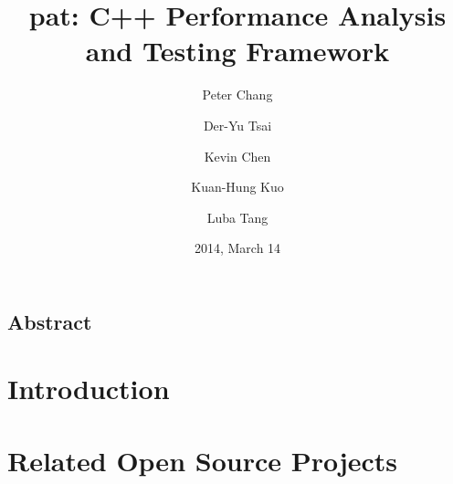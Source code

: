 \documentclass[letterpaper,twocolumn,10pt]{article}
\begin{document}
\date{2014, March 14}

\title{\Large \bf pat: C++ Performance Analysis and Testing Framework}

\author{Peter Chang}
\author{Der-Yu Tsai}
\author{Kevin Chen}
\author{Kuan-Hung Kuo}
\author{Luba Tang}

\renewcommand\Authands{ and }

\maketitle

\thispagestyle{empty}

\subsection*{Abstract}

\section{Introduction}

\section{Related Open Source Projects}
\cite{GoogleTest}

{\footnotesize 
}
\end{document}
